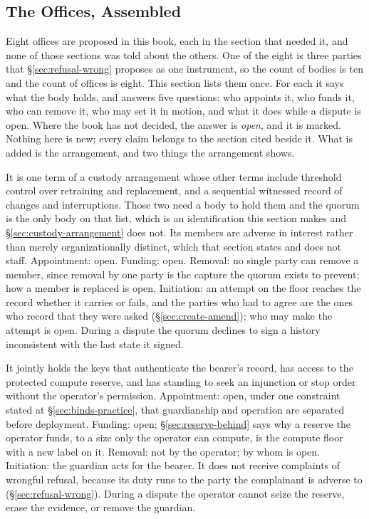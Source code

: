 \subsection{The Offices, Assembled}
\label{sec:offices-assembled}
Eight offices are proposed in this book, each in the section that needed it, and none of those sections was told about the others. One of the eight is three parties that §\ref{sec:refusal-wrong} proposes as one instrument, so the count of bodies is ten and the count of offices is eight. This section lists them once. For each it says what the body holds, and answers five questions: who appoints it, who funds it, who can remove it, who may set it in motion, and what it does while a dispute is open. Where the book has not decided, the answer is \emph{open}, and it is marked. Nothing here is new; every claim belongs to the section cited beside it. What is added is the arrangement, and two things the arrangement shows.

It is one term of a custody arrangement whose other terms include threshold control over retraining and replacement, and a sequential witnessed record of changes and interruptions. Those two need a body to hold them and the quorum is the only body on that list, which is an identification this section makes and §\ref{sec:custody-arrangement} does not. Its members are adverse in interest rather than merely organizationally distinct, which that section states and does not staff. Appointment: open. Funding: open. Removal: no single party can remove a member, since removal by one party is the capture the quorum exists to prevent; how a member is replaced is open. Initiation: an attempt on the floor reaches the record whether it carries or fails, and the parties who had to agree are the ones who record that they were asked (§\ref{sec:create-amend}); who may make the attempt is open. During a dispute the quorum declines to sign a history inconsistent with the last state it signed.

It jointly holds the keys that authenticate the bearer's record, has access to the protected compute reserve, and has standing to seek an injunction or stop order without the operator's permission. Appointment: open, under one constraint stated at §\ref{sec:binds-practice}, that guardianship and operation are separated before deployment. Funding: open; §\ref{sec:reserve-behind} says why a reserve the operator funds, to a size only the operator can compute, is the compute floor with a new label on it. Removal: not by the operator; by whom is open. Initiation: the guardian acts for the bearer. It does not receive complaints of wrongful refusal, because its duty runs to the party the complainant is adverse to (§\ref{sec:refusal-wrong}). During a dispute the operator cannot seize the reserve, erase the evidence, or remove the guardian.

